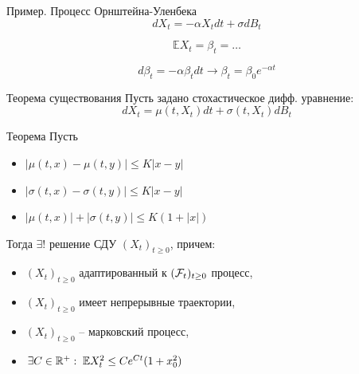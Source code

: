 \documentclass{beamer}
\begin{document}
\begin{frame}{Пример. Процесс Орнштейна-Уленбека}
    $$
        d X_t = -\alpha X_t dt + \sigma dB_t
    $$
      
    $$
        \mathbb{E} X_t = \beta_t = \ldots
    $$
      
    $$
        d \beta_t = -\alpha \beta_t dt \longrightarrow    \beta_t = \beta_0 e^{-\alpha t}  
    $$
    \pause
\end{frame}
\begin{frame}{Теорема существования}
    Пусть задано стохастическое дифф. уравнение:
    $$
        dX_t = \mu(t, X_t) dt + \sigma(t, X_t) dB_t
    $$
    \begin{block}{Теорема}
        Пусть 
        \begin{itemize}
            \item $|\mu(t, x) - \mu(t, y)| \leq K |x - y|$
            \item $|\sigma(t, x) - \sigma(t, y)| \leq K |x - y|$
            \item $|\mu(t, x)| + |\sigma(t, y)| \leq K (1 + |x|)$
        \end{itemize}

        Тогда $\exists !$ решение СДУ $(X_t)_{t\geq 0}$, причем:
        \begin{itemize}
            \item $(X_t)_{t\geq 0}$ адаптированный к $(\mathcal{F}_t)_{t\geq0}$ процесс,
            \item $(X_t)_{t\geq 0}$ имеет непрерывные траектории,
            \item $(X_t)_{t\geq 0}$ -- марковский процесс,
            \item $\exists C \in \mathbb{R}^+: \;\mathbb{E} X_t^2 \leq Ce^{Ct}(1+x_0^2)$
        \end{itemize}
    \end{block}
\end{frame}
\end{document}

